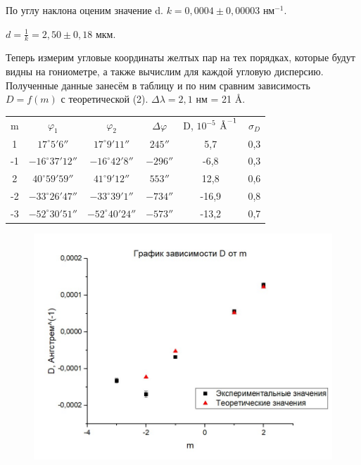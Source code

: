 \documentclass[a4paper,12pt]{article} %
\begin{document}
По углу наклона оценим значение d. $k = 0,0004 \pm 0,00003$ $\text{нм}^{-1}$.

$d = \frac{1}{k} = 2,50 \pm 0,18$ мкм.

Теперь измерим угловые координаты желтых пар на тех порядках, которые будут видны на гониометре, а также вычислим для каждой угловую дисперсию. Полученные данные занесём в таблицу и по ним сравним зависимость $D = f(m)$ с теоретической (2). $\Delta \lambda = 2,1$ нм = 21 \r{A}.

\begin{table}[H]
	\centering
	\begin{tabular}{c|c|c|c|c|c}
	 m & $\varphi_1$ & $\varphi_2$ & $\Delta \varphi$ & D, $10^{-5}$ $\text{\r{A}}^{-1}$ & $\sigma_D$ \\
	 1 & $17^\circ 5' 6''$     & $17^\circ 9' 11''$   & $245''$  &  5,7 & 0,3 \\
 	-1 & $-16^\circ 37' 12''$  & $-16^\circ 42' 8''$  & $-296''$ & -6,8 & 0,3 \\
 	 2 & $40^\circ 59' 59''$   & $41^\circ 9' 12'' $  & $553''$  &  12,8 & 0,6\\
 	-2 & $-33^\circ 26' 47''$  & $-33^\circ 39' 1''$  & $-734''$ & -16,9 & 0,8\\
 	-3 & $-52^\circ 30' 51''$  & $-52^\circ 40' 24''$ & $-573''$ & -13,2 & 0,7\\
	
	\end{tabular}
\end{table}

\begin{figure}[H]
	\centering
	\includegraphics[scale=0.8]{graph2}
\end{figure}
\end{document}

